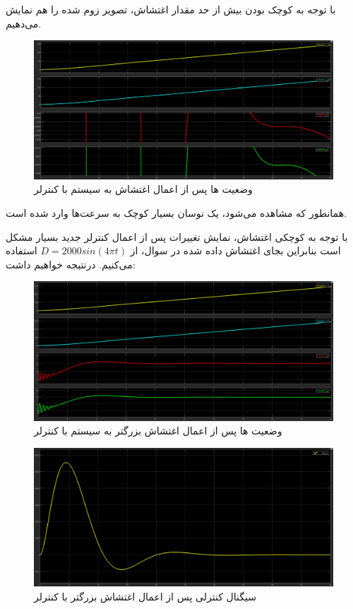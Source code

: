 \documentclass[14pt, a4paper]{extarticle}
\begin{document}
با توجه به کوچک بودن بیش از حد مقدار اغتشاش، تصویر زوم شده را هم نمایش می‌دهیم.
\begin{figure}[h!]
	\centering
	\includegraphics[scale = 0.4]{Q2_3_1_states2.png}
	\caption{وضعیت 
		ها پس از اعمال اغتشاش به سیستم با کنترلر 
		}
\end{figure}

همانطور که مشاهده می‌شود،‌ یک نوسان بسیار کوچک به سرعت‌ها وارد شده است.

\newpage

با توجه به کوچکی اغتشاش، نمایش تغییرات پس از اعمال کنترلر جدید بسیار مشکل است بنابراین بجای اغتشاش داده شده در سوال، از 
$D = 2000sin(4\pi t)$
استفاده می‌کنیم. درنتیجه خواهیم داشت:
\begin{figure}[h!]
	\centering
	\includegraphics[scale = 0.4]{Q2_3_1_states1D.png}
	\caption{وضعیت 
		ها پس از اعمال اغتشاش بزرگتر به سیستم با کنترلر 
		}
\end{figure}

\begin{figure}[h!]
	\centering
	\includegraphics[scale = 0.4]{Q2_3_1_controlD.png}
	\caption{سیگنال کنترلی پس از اعمال اغتشاش بزرگتر با کنترلر 
		}
\end{figure}
\end{document}
